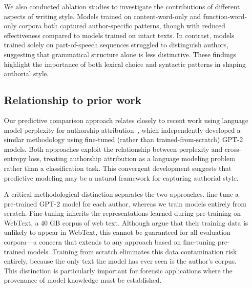 \documentclass[11pt]{article}
\begin{document}
We also conducted ablation studies to investigate the contributions of different
aspects of writing style. Models trained on content-word-only and function-word-only
corpora both captured author-specific patterns, though with reduced effectiveness
compared to models trained on intact texts. In contrast, models trained solely on
part-of-speech sequences struggled to distinguish authors, suggesting that
grammatical structure alone is less distinctive. These findings highlight the
importance of both lexical choice and syntactic patterns in shaping authorial style.

\subsection{Relationship to prior work}

Our predictive comparison approach relates closely to recent work using
language model perplexity for authorship attribution~\citep{HuanEtal25}, which
independently developed a similar methodology using fine-tuned (rather than
trained-from-scratch) GPT-2 models. Both approaches exploit the relationship
between perplexity and cross-entropy loss, treating authorship attribution as a
language modeling problem rather than a classification task. This convergent
development suggests that predictive modeling may be a natural framework for
capturing authorial style.

A critical methodological distinction separates the two approaches.
\citet{HuanEtal25} fine-tune a pre-trained GPT-2 model for each author,
whereas we train models entirely from scratch. Fine-tuning inherits the
representations learned during pre-training on WebText, a 40 GB corpus of web
text. Although \citet{HuanEtal25} argue that their training data is unlikely to
appear in WebText, this cannot be guaranteed for all evaluation corpora---a
concern that extends to any approach based on fine-tuning pre-trained models.
Training from scratch eliminates this data contamination risk entirely, because
the only text the model has ever seen is the author's corpus. This distinction
is particularly important for forensic applications where the provenance of
model knowledge must be established.
\end{document}
